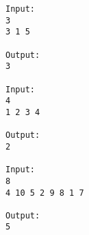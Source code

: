 \begin{verbatim}
Input:
3
3 1 5

Output:
3

Input:
4
1 2 3 4

Output:
2

Input:
8
4 10 5 2 9 8 1 7

Output:
5
\end{verbatim}